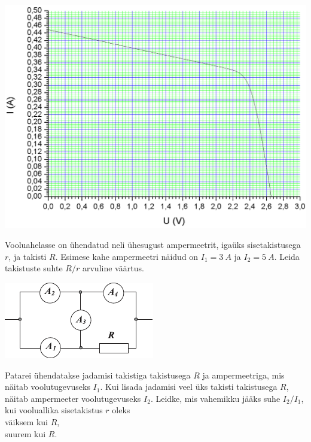 \documentclass[10pt]{article}
\begin{document}
{\begin{center}
	\includegraphics[width=0.9\linewidth]{2010-v3g-03-paneel_yl.png}
\end{center}
\probend
\bigskip


Vooluahelasse on ühendatud neli ühesugust ampermeetrit, igaüks sisetakistusega $r$, ja takisti $R$. Esimese kahe ampermeetri näidud on $I_1= \SI{3}{A}$ ja $I_2= \SI{5}{A}$. Leida takistuste suhte $R/r$ arvuline väärtus.

\begin{center}
	\includegraphics[width=0.6\linewidth]{2008-lahg-04-yl}
\end{center}
\probend
\bigskip


Patarei ühendatakse jadamisi takistiga takistusega $R$ ja ampermeetriga, mis näitab voolutugevuseks $I_1$. Kui lisada jadamisi veel üks takisti takistusega $R$, näitab ampermeeter voolutugevuseks $I_2$. Leidke, mis vahemikku jääks suhe $I_2/I_1$, kui vooluallika sisetakistus $r$ oleks\\
\osa väiksem kui $R$,\\
\osa suurem kui $R$.
\probend
\bigskip

}
\end{document}

